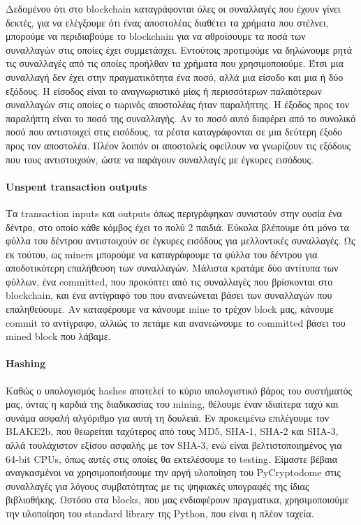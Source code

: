 \documentclass[titlepage]{article}
\begin{document}
Δεδομένου ότι στο blockchain καταγράφονται όλες οι συναλλαγές που έχουν γίνει δεκτές, για να ελέγξουμε ότι ένας αποστολέας διαθέτει τα χρήματα που στέλνει, μπορούμε να περιδιαβούμε το blockchain για να αθροίσουμε τα ποσά των συναλλαγών στις οποίες έχει συμμετάσχει. Εντούτοις προτιμούμε να δηλώνουμε ρητά τις συναλλαγές από τις οποίες προήλθαν τα χρήματα που χρησιμοποιούμε. Έτσι μια συναλλαγή δεν έχει στην πραγματικότητα ένα ποσό, αλλά μια είσοδο και μια ή δύο εξόδους. Η είσοδος είναι το αναγνωριστικό μίας ή περισσότερων παλαιότερων συναλλαγών στις οποίες ο τωρινός αποστολέας ήταν παραλήπτης. Η έξοδος προς τον παραλήπτη είναι το ποσό της συναλλαγής. Αν το ποσό αυτό διαφέρει από το συνολικό ποσό που αντιστοιχεί στις εισόδους, τα ρέστα καταγράφονται σε μια δεύτερη έξοδο προς τον αποστολέα. Πλέον λοιπόν οι αποστολείς οφείλουν να γνωρίζουν τις εξόδους που τους αντιστοιχούν, ώστε να παράγουν συναλλαγές με έγκυρες εισόδους.

\paragraph{Unspent transaction outputs}

Τα transaction inputs και outputs όπως περιγράφηκαν συνιστούν στην ουσία ένα δέντρο, στο οποίο κάθε κόμβος έχει το πολύ 2 παιδιά. Εύκολα βλέπουμε ότι μόνο τα φύλλα του δέντρου αντιστοιχούν σε έγκυρες εισόδους για μελλοντικές συναλλαγές. Ως εκ τούτου, ως miners μπορούμε να καταγράφουμε τα φύλλα του δέντρου για αποδοτικότερη επαλήθευση των συναλλαγών. Μάλιστα κρατάμε δύο αντίτυπα των φύλλων, ένα committed, που προκύπτει από τις συναλλαγές που βρίσκονται στο blockchain, και ένα αντίγραφό του που ανανεώνεται βάσει των συναλλαγών που επαληθεύουμε. Αν καταφέρουμε να κάνουμε mine το τρέχον block μας, κάνουμε commit το αντίγραφο, αλλιώς το πετάμε και ανανεώνουμε το committed βάσει του mined block που λάβαμε.

\paragraph{Hashing}

Καθώς ο υπολογισμός hashes αποτελεί το κύριο υπολογιστικό βάρος του συστήματός μας, όντας η καρδιά της διαδικασίας του mining, θέλουμε έναν ιδιαίτερα ταχύ και συνάμα ασφαλή αλγόριθμο για αυτή τη δουλειά. Εν προκειμένω επιλέγουμε τον BLAKE2b, που θεωρείται ταχύτερος από τους MD5, SHA-1, SHA-2 και SHA-3, αλλά τουλάχιστον εξίσου ασφαλής με τον SHA-3, ενώ είναι βελτιστοποιημένος για 64-bit CPUs, όπως αυτές στις οποίες θα εκτελέσουμε το testing. Είμαστε βέβαια αναγκασμένοι να χρησιμοποιήσουμε την αργή υλοποίηση του PyCryptodome στις συναλλαγές για λόγους συμβατότητας με τις ψηφιακές υπογραφές της ίδιας βιβλιοθήκης. Ωστόσο στα blocks, που μας ενδιαφέρουν πραγματικα, χρησιμοποιούμε την υλοποίηση του standard library της Python, που είναι η πλέον ταχεία.
\end{document}
